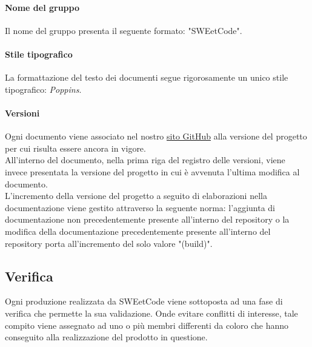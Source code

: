 \documentclass[10pt, a4paper]{article}
\begin{document}
        \paragraph{Nome del gruppo}Il nome del gruppo presenta il seguente formato: "SWEetCode".
        
        \paragraph{Stile tipografico}La formattazione del testo dei documenti segue rigorosamente un unico stile tipografico: \textit{Poppins}.
        
        \paragraph{Versioni}Ogni documento viene associato nel nostro \href{https://sweetcode-team.github.io/}{sito GitHub} alla versione del progetto per cui risulta essere ancora in vigore.\\
        All'interno del documento, nella prima riga del registro delle versioni, viene invece presentata la versione del progetto in cui è avvenuta l'ultima modifica al documento.\\
        L'incremento della versione del progetto a seguito di elaborazioni nella documentazione viene gestito attraverso la seguente norma: l'aggiunta di documentazione non precedentemente presente all'interno del repository o la modifica della documentazione precedentemente presente all'interno del repository porta all'incremento del solo valore "(build)".

\subsection{Verifica}
Ogni produzione realizzata da SWEetCode viene sottoposta ad una fase di verifica che permette la sua validazione.
Onde evitare conflitti di interesse, tale compito viene assegnato ad uno o più membri differenti da coloro che hanno conseguito alla realizzazione del prodotto in questione.
\end{document}
